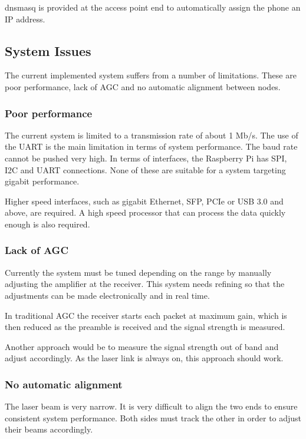 dnsmasq is provided at the access point end to automatically assign the phone
an IP address.

\subsection{System Issues}
The current implemented system suffers from a number of limitations. These are
poor performance, lack of \ac{AGC} and no automatic alignment between nodes.

\subsubsection{Poor performance}
The current system is limited to a transmission rate of about 1 Mb/s. The use
of the \ac{UART} is the main limitation in terms of system performance. The baud
rate cannot be pushed very high. In terms of interfaces, the Raspberry Pi has
\ac{SPI}, \ac{I2C} and \ac{UART} connections. None of these are suitable for
a system targeting gigabit performance.

Higher speed interfaces, such as gigabit Ethernet, \ac{SFP}, \ac{PCIe} or
\ac{USB} 3.0 and above, are required. A high speed processor that can process
the data quickly enough is also required.

\subsubsection{Lack of \ac{AGC}}
Currently the system must be tuned depending on the range by manually
adjusting the amplifier at the receiver. This system needs refining so that
the adjustments can be made electronically and in real time.

In traditional \ac{AGC} the receiver starts each packet at maximum gain,
which is then reduced as the preamble is received and the signal strength
is measured.

Another approach would be to measure the signal strength out of band and
adjust accordingly. As the laser link is always on, this approach should work.

\subsubsection{No automatic alignment}
The laser beam is very narrow. It is very difficult to align the two ends
to ensure consistent system performance. Both sides must track the other in
order to adjust their beams accordingly.

